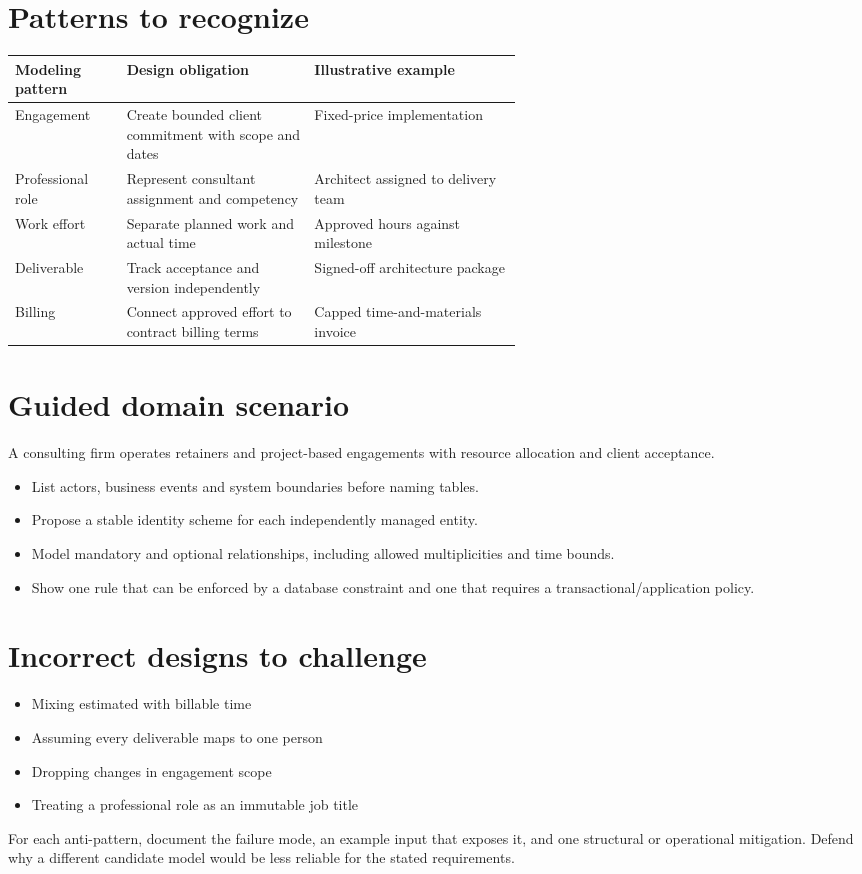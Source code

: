 \documentclass[11pt,letterpaper]{article}
\begin{document}
\section{Patterns to recognize}
\begin{tabularx}{\linewidth}{@{}>{\raggedright\arraybackslash}p{0.22\linewidth} >{\raggedright\arraybackslash}p{0.37\linewidth}>{\raggedright\arraybackslash}X@{}}
\toprule
\textbf{Modeling pattern} & \textbf{Design obligation} & \textbf{Illustrative example} \\ 
\midrule
Engagement & Create bounded client commitment with scope and dates & Fixed-price implementation \\ 
Professional role & Represent consultant assignment and competency & Architect assigned to delivery team \\ 
Work effort & Separate planned work and actual time & Approved hours against milestone \\ 
Deliverable & Track acceptance and version independently & Signed-off architecture package \\ 
Billing & Connect approved effort to contract billing terms & Capped time-and-materials invoice \\ 
\bottomrule
\end{tabularx}

\section{Guided domain scenario}
A consulting firm operates retainers and project-based engagements with resource allocation and client acceptance.

\begin{itemize}
\item List actors, business events and system boundaries before naming tables.
\item Propose a stable identity scheme for each independently managed entity.
\item Model mandatory and optional relationships, including allowed multiplicities and time bounds.
\item Show one rule that can be enforced by a database constraint and one that requires a transactional/application policy.
\end{itemize}

\section{Incorrect designs to challenge}
\begin{itemize}
\item Mixing estimated with billable time
\item Assuming every deliverable maps to one person
\item Dropping changes in engagement scope
\item Treating a professional role as an immutable job title
\end{itemize}
For each anti-pattern, document the failure mode, an example input that exposes it, and one structural or operational mitigation. Defend why a different candidate model would be less reliable for the stated requirements.
\end{document}
